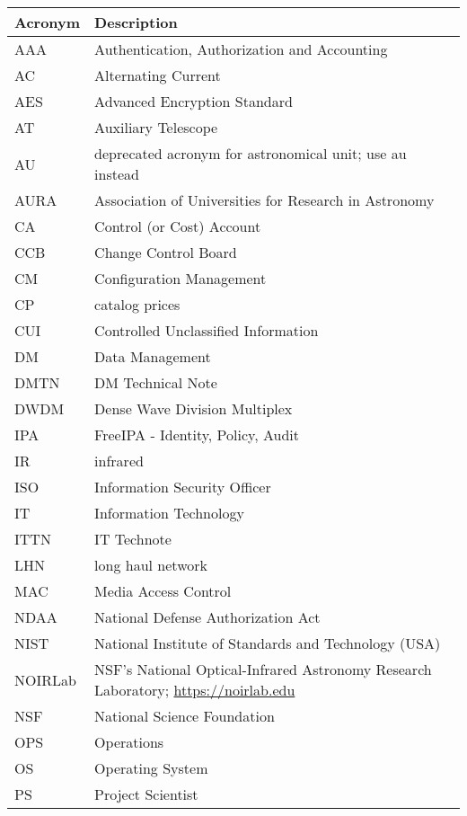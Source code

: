 \addtocounter{table}{-1}
\begin{longtable}{p{}p{}}\hline
\textbf{Acronym} & \textbf{Description}  \\\hline

AAA & Authentication, Authorization and Accounting \\\hline
AC & Alternating Current \\\hline
AES & Advanced Encryption Standard \\\hline
AT & Auxiliary Telescope \\\hline
AU & deprecated acronym for astronomical unit; use au instead \\\hline
AURA & Association of Universities for Research in Astronomy \\\hline
CA & Control (or Cost) Account \\\hline
CCB & Change Control Board \\\hline
CM & Configuration Management \\\hline
CP & catalog prices \\\hline
CUI & Controlled Unclassified Information \\\hline
DM & Data Management \\\hline
DMTN & DM Technical Note \\\hline
DWDM & Dense Wave Division Multiplex \\\hline
IPA & FreeIPA - Identity, Policy, Audit \\\hline
IR & infrared \\\hline
ISO & Information Security Officer \\\hline
IT & Information Technology \\\hline
ITTN & IT Technote \\\hline
LHN & long haul network \\\hline
MAC & Media Access Control \\\hline
NDAA & National Defense Authorization Act \\\hline
NIST & National Institute of Standards and Technology (USA) \\\hline
NOIRLab & NSF's National Optical-Infrared Astronomy Research Laboratory; \url{https://noirlab.edu} \\\hline
NSF & National Science Foundation \\\hline
OPS & Operations \\\hline
OS & Operating System \\\hline
PS & Project Scientist \\\hline

\end{longtable}
